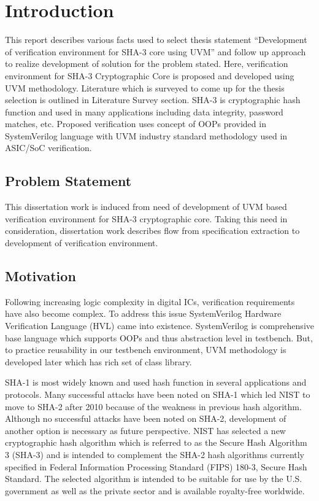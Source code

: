 \chapter{Introduction}

This report describes various facts used to select thesis statement “Development of verification environment for SHA-3 core using UVM” and follow up approach to realize development of solution for the problem stated. Here, verification environment for SHA-3 Cryptographic Core is proposed and developed using UVM methodology. Literature which is surveyed to come up for the thesis selection is outlined in Literature Survey section. SHA-3 is cryptographic hash function and used in many applications including data integrity, password matches, etc. Proposed verification uses concept of OOPs provided in SystemVerilog language with UVM industry standard methodology used in ASIC/SoC verification.

\section{Problem Statement}

This dissertation work is induced from need of development of UVM based verification environment for SHA-3 cryptographic core. Taking this need in consideration, dissertation work describes flow from specification extraction to development of verification environment.


\section{Motivation}

Following increasing logic complexity in digital ICs, verification requirements have also become complex. To address this issue SystemVerilog Hardware Verification Language (HVL) came into existence. SystemVerilog is comprehensive base language which supports OOPs and thus abstraction level in testbench. But, to practice reusability in our testbench environment, UVM methodology is developed later which has rich set of class library. \par

SHA-1 is most widely known and used hash function in several applications and protocols. Many successful attacks have been noted on SHA-1 which led NIST to move to SHA-2 after 2010 because of the weakness in previous hash algorithm. Although no successful attacks have been noted on SHA-2, development of another option is necessary as future perspective. NIST has selected a new cryptographic hash algorithm which is referred to as the Secure Hash Algorithm 3 (SHA-3) and is intended to complement the SHA-2 hash algorithms currently specified in Federal Information Processing Standard (FIPS) 180-3, Secure Hash Standard. The selected algorithm is intended to be suitable for use by the U.S. government as well as the private sector and is available royalty-free worldwide\cite{fips202}. \par

